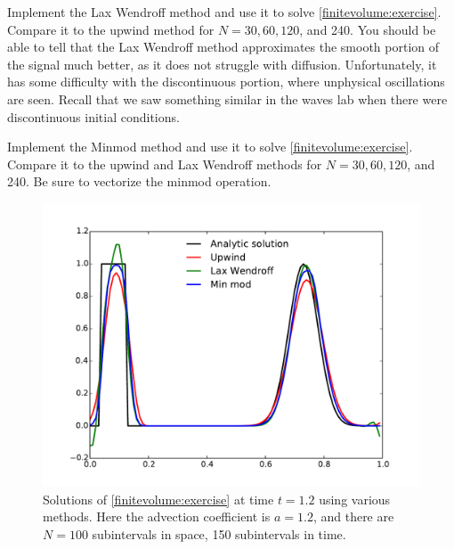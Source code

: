 
\begin{problem}
	Implement the Lax Wendroff method and use it to solve \eqref{finitevolume:exercise}. Compare it to the upwind method for $N = 30, 60, 120$, and 240. You should be able to tell that the Lax Wendroff method approximates the smooth portion of the signal much better, as it does not struggle with diffusion. Unfortunately, it has some difficulty with the discontinuous portion, where unphysical oscillations are seen. Recall that we saw something similar in the waves lab when there were discontinuous initial conditions. 
\end{problem}


\begin{problem}
	Implement the Minmod method and use it to solve \eqref{finitevolume:exercise}. Compare it to the upwind and Lax Wendroff methods for $N = 30, 60, 120$, and 240. Be sure to vectorize the minmod operation.
\end{problem}


\begin{figure}[ht]
\centering
\includegraphics[width=\textwidth]{FiniteVolume_Comparisons.pdf}
\caption{Solutions of \eqref{finitevolume:exercise} at time $t = 1.2$ using various methods. Here the advection coefficient is $a = 1.2$, and there are  $N = 100$ subintervals in space, 150 subintervals in time. }\label{finitevolume:Comparisons}
\end{figure}


